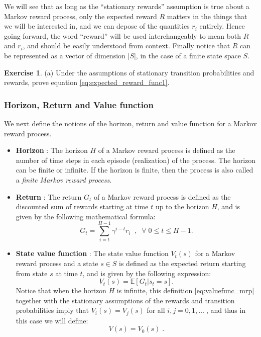 \documentclass{article}
\theoremstyle{definition}
\newtheorem{exercise}{Exercise}[section]
\theoremstyle{remark}
\newcommand{\E}{\mathbb{E}}                                        %
\begin{document}
We will see that as long as the ``stationary rewards'' assumption is true about a Markov reward process, only the expected reward $R$ matters in the things that we will be interested in, and we can depose of the quantities $r_i$ entirely. Hence going forward, the word ``reward'' will be used interchangeably to mean both $R$ and $r_i$, and should be easily understood from context. Finally notice that $R$ can be represented as a vector of dimension $|S|$, in the case of a finite state space $S$.

\begin{exercise}
(a) Under the assumptions of stationary transition probabilities and rewards, prove equation \eqref{eq:expected_reward_func1}.
\label{ex-Rstationary}
\end{exercise}

\subsubsection{Horizon, Return and Value function}
We next define the notions of the horizon, return and value function for a Markov reward process. 

\begin{itemize}
\item \textbf{Horizon} : The horizon $H$ of a Markov reward process is defined as the number of time steps in each episode (realization) of the process. The horizon can be finite or infinite. If the horizon is finite, then the process is also called a \textit{finite Markov reward process}.
\item \textbf{Return} : The return $G_t$ of a Markov reward process is defined as the discounted sum of rewards starting at time $t$ up to the horizon $H$, and is given by the following mathematical formula:
\begin{equation}
G_t = \sum_{i=t}^{H-1}\gamma^{i-t} r_i \;\;,\;\; \forall \; 0 \leq t \leq H-1.
\label{eq:return_mrp}
\end{equation}
\item \textbf{State value function} : The state value function $V_t(s)$ for a Markov reward process and a state $s \in S$ is defined as the expected return starting from state $s$ at time $t$, and is given by the following expression:
\begin{equation}
V_t(s) = \E[G_t|s_t = s].
\label{eq:valuefunc_mrp}
\end{equation}
Notice that when the horizon $H$ is infinite, this definition \eqref{eq:valuefunc_mrp} together with the stationary assumptions of the rewards and transition probabilities imply that $V_i(s) = V_j(s)$ for all $i,j = 0,1,\dots \;$, and thus in this case we will define:
\begin{equation}
V(s) = V_0(s) \;.
\label{eq:valuefunc_mrp_infinite}
\end{equation}
\end{itemize}
\end{document}
